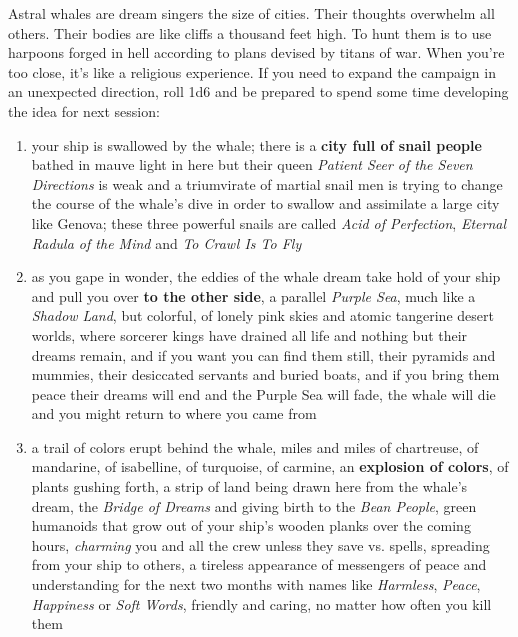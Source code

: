 \documentclass[11pt]{bxart}
\begin{document}
Astral whales are dream singers the size of cities. Their thoughts overwhelm all others. Their bodies are like cliffs a thousand feet high. To hunt them is to use harpoons forged in hell according to plans devised by titans of war. When you're too close, it's like a religious experience. If you need to expand the campaign in an unexpected direction, roll 1d6 and be prepared to spend some time developing the idea for next session:

\begin{enumerate}
\item your ship is swallowed by the whale; there is a \textbf{city full of snail people} bathed in mauve light in here but their queen \textit{Patient Seer of the Seven Directions} is weak and a triumvirate of martial snail men is trying to change the course of the whale's dive in order to swallow and assimilate a large city like Genova; these three powerful snails are called \textit{Acid of Perfection}, \textit{Eternal Radula of the Mind} and \textit{To Crawl Is To Fly}


\item as you gape in wonder, the eddies of the whale dream take hold of your ship and pull you over \textbf{to the other side}, a parallel \textit{Purple Sea}, much like a \textit{Shadow Land}, but colorful, of lonely pink skies and atomic tangerine desert worlds, where sorcerer kings have drained all life and nothing but their dreams remain, and if you want you can find them still, their pyramids and mummies, their desiccated servants and buried boats, and if you bring them peace their dreams will end and the Purple Sea will fade, the whale will die and you might return to where you came from

\item a trail of colors erupt behind the whale, miles and miles of chartreuse, of mandarine, of isabelline, of turquoise, of carmine, an \textbf{explosion of colors}, of plants gushing forth, a strip of land being drawn here from the whale's dream, the \textit{Bridge of Dreams} and giving birth to the \textit{Bean People}, green humanoids that grow out of your ship's wooden planks over the coming hours, \textit{charming} you and all the crew unless they save vs. spells, spreading from your ship to others, a tireless appearance of messengers of peace and understanding for the next two months with names like \textit{Harmless}, \textit{Peace}, \textit{Happiness} or \textit{Soft Words}, friendly and caring, no matter how often you kill them


\end{enumerate}
\end{document}
